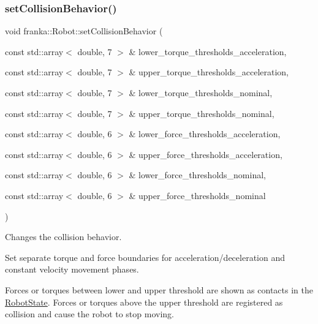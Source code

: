 \subsubsection{\texorpdfstring{set\+Collision\+Behavior()}{setCollisionBehavior()}\hspace{0.1cm}{\footnotesize\ttfamily [1/2]}}
{\footnotesize\ttfamily void franka\+::\+Robot\+::set\+Collision\+Behavior (\begin{DoxyParamCaption}\item[{const std\+::array$<$ double, 7 $>$ \&}]{lower\+\_\+torque\+\_\+thresholds\+\_\+acceleration,  }\item[{const std\+::array$<$ double, 7 $>$ \&}]{upper\+\_\+torque\+\_\+thresholds\+\_\+acceleration,  }\item[{const std\+::array$<$ double, 7 $>$ \&}]{lower\+\_\+torque\+\_\+thresholds\+\_\+nominal,  }\item[{const std\+::array$<$ double, 7 $>$ \&}]{upper\+\_\+torque\+\_\+thresholds\+\_\+nominal,  }\item[{const std\+::array$<$ double, 6 $>$ \&}]{lower\+\_\+force\+\_\+thresholds\+\_\+acceleration,  }\item[{const std\+::array$<$ double, 6 $>$ \&}]{upper\+\_\+force\+\_\+thresholds\+\_\+acceleration,  }\item[{const std\+::array$<$ double, 6 $>$ \&}]{lower\+\_\+force\+\_\+thresholds\+\_\+nominal,  }\item[{const std\+::array$<$ double, 6 $>$ \&}]{upper\+\_\+force\+\_\+thresholds\+\_\+nominal }\end{DoxyParamCaption})}

Changes the collision behavior.

Set separate torque and force boundaries for acceleration/deceleration and constant velocity movement phases.

Forces or torques between lower and upper threshold are shown as contacts in the \hyperlink{structfranka_1_1RobotState}{Robot\+State}. Forces or torques above the upper threshold are registered as collision and cause the robot to stop moving.


